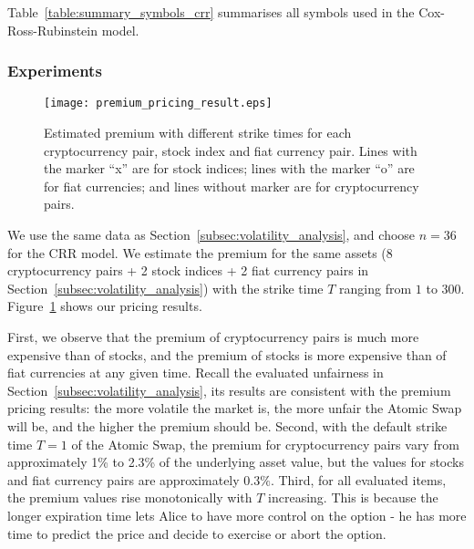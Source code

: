 Table~\ref{table:summary_symbols_crr} summarises all symbols used in the Cox-Ross-Rubinstein model. 

\subsubsection{Experiments}

\begin{figure}[htp]
    \texttt{[image: premium\_pricing\_result.eps]}
    \caption{Estimated premium with different strike times for each cryptocurrency pair, stock index and fiat currency pair. Lines with the marker ``x'' are for stock indices; lines with the marker ``o'' are for fiat currencies; and lines without marker are for cryptocurrency pairs.}
    \label{fig:premium_pricing_result}
\end{figure}

We use the same data as Section~\ref{subsec:volatility_analysis}, and choose $n = 36$ for the CRR model.
We estimate the premium for the same assets (8 cryptocurrency pairs + 2 stock indices + 2 fiat currency pairs in Section~\ref{subsec:volatility_analysis}) with the strike time $T$ ranging from $1$ to $300$.
Figure~\ref{fig:premium_pricing_result} shows our pricing results.

First, we observe that the premium of cryptocurrency pairs is much more expensive than of stocks, and the premium of stocks is more expensive than of fiat currencies at any given time.
Recall the evaluated unfairness in Section~\ref{subsec:volatility_analysis}, its results are consistent with the premium pricing results: the more volatile the market is, the more unfair the Atomic Swap will be, and the higher the premium should be.
Second, with the default strike time $T = 1$ of the Atomic Swap, the premium for cryptocurrency pairs vary from approximately 1\% to 2.3\% of the underlying asset value, but the values for stocks and fiat currency pairs are approximately $0.3\%$.
Third, for all evaluated items, the premium values rise monotonically with $T$ increasing.
This is because the longer expiration time lets Alice to have more control on the option -
he has more time to predict the price and decide to exercise or abort the option.